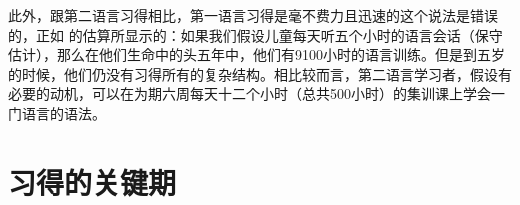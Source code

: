 
此外，跟第二语言习得相比，第一语言习得是毫不费力且迅速的这个说法是错误的，正如 \citet[]{Klein86a-u}的估算所显示的：如果我们假设儿童每天听五个小时的语言会话（保守估计），那么在他们生命中的头五年中，他们有9100小时的语言训练。但是到五岁的时候，他们仍没有习得所有的复杂结构。相比较而言，第二语言学习者，假设有必要的动机，可以在为期六周每天十二个小时（总共500小时）的集训课上学会一门语言的语法。

\section{习得的关键期}

